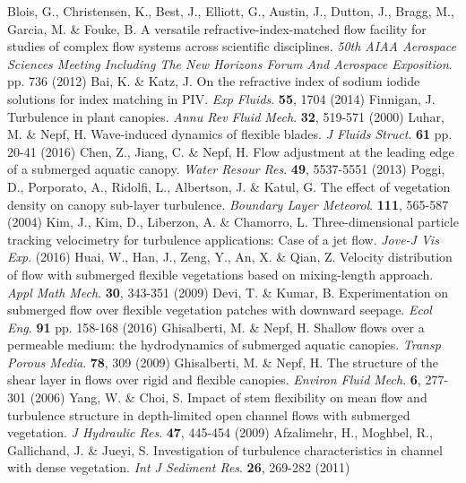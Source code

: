 \documentclass[lineno,authoryear]{FLO_v1}%
\theoremstyle{definition}
\begin{document}
\begin{Backmatter}
\begin{thebibliography}{}
Blois, G., Christensen, K., Best, J., Elliott, G., Austin, J., Dutton, J., Bragg, M., Garcia, M. \& Fouke, B. A versatile refractive-index-matched flow facility for studies of complex flow systems across scientific disciplines. {\em 50th AIAA Aerospace Sciences Meeting Including The New Horizons Forum And Aerospace Exposition}. pp. 736 (2012)
Bai, K. \& Katz, J. On the refractive index of sodium iodide solutions for index matching in PIV. {\em Exp Fluids}. \textbf{55}, 1704 (2014)
Finnigan, J. Turbulence in plant canopies. {\em Annu Rev Fluid Mech}. \textbf{32}, 519-571 (2000)
Luhar, M. \& Nepf, H. Wave-induced dynamics of flexible blades. {\em J Fluids Struct}. \textbf{61} pp. 20-41 (2016)
Chen, Z., Jiang, C. \& Nepf, H. Flow adjustment at the leading edge of a submerged aquatic canopy. {\em Water Resour Res}. \textbf{49}, 5537-5551 (2013)
Poggi, D., Porporato, A., Ridolfi, L., Albertson, J. \& Katul, G. The effect of vegetation density on canopy sub-layer turbulence. {\em Boundary Layer Meteorol}. \textbf{111}, 565-587 (2004)
Kim, J., Kim, D., Liberzon, A. \& Chamorro, L. Three-dimensional particle tracking velocimetry for turbulence applications: Case of a jet flow. {\em Jove-J Vis Exp}. (2016)
Huai, W., Han, J., Zeng, Y., An, X. \& Qian, Z. Velocity distribution of flow with submerged flexible vegetations based on mixing-length approach. {\em Appl Math Mech}. \textbf{30}, 343-351 (2009)
Devi, T. \& Kumar, B. Experimentation on submerged flow over flexible vegetation patches with downward seepage. {\em Ecol Eng}. \textbf{91} pp. 158-168 (2016)
Ghisalberti, M. \& Nepf, H. Shallow flows over a permeable medium: the hydrodynamics of submerged aquatic canopies. {\em Transp Porous Media}. \textbf{78}, 309 (2009)
Ghisalberti, M. \& Nepf, H. The structure of the shear layer in flows over rigid and flexible canopies. {\em Environ Fluid Mech}. \textbf{6}, 277-301 (2006)
Yang, W. \& Choi, S. Impact of stem flexibility on mean flow and turbulence structure in depth-limited open channel flows with submerged vegetation. {\em J Hydraulic Res}. \textbf{47}, 445-454 (2009)
Afzalimehr, H., Moghbel, R., Gallichand, J. \& Jueyi, S. Investigation of turbulence characteristics in channel with dense vegetation. {\em Int J Sediment Res}. \textbf{26}, 269-282 (2011)

\end{thebibliography}
\end{Backmatter}
\end{document}

